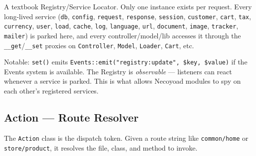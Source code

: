 \documentclass[11pt,a4paper]{article}
\begin{document}
A textbook Registry/Service Locator. Only one instance exists per
request. Every long-lived service (\texttt{db}, \texttt{config},
\texttt{request}, \texttt{response}, \texttt{session},
\texttt{customer}, \texttt{cart}, \texttt{tax}, \texttt{currency},
\texttt{user}, \texttt{load}, \texttt{cache}, \texttt{log},
\texttt{language}, \texttt{url}, \texttt{document}, \texttt{image},
\texttt{tracker}, \texttt{mailer}) is parked here, and every
controller/model/lib accesses it through the \texttt{\_\_get}/\texttt{\_\_set}
proxies on \texttt{Controller}, \texttt{Model}, \texttt{Loader},
\texttt{Cart}, etc.

Notable: \texttt{set()} emits \texttt{Events::emit("registry:update",
\$key, \$value)} if the Events system is available. The Registry is
\emph{observable} --- listeners can react whenever a service is
parked. This is what allows Necoyoad modules to spy on each other's
registered services.

\subsection{Action --- Route Resolver}

The \texttt{Action} class is the dispatch token. Given a route
string like \texttt{common/home} or \texttt{store/product}, it
resolves the file, class, and method to invoke.
\end{document}
